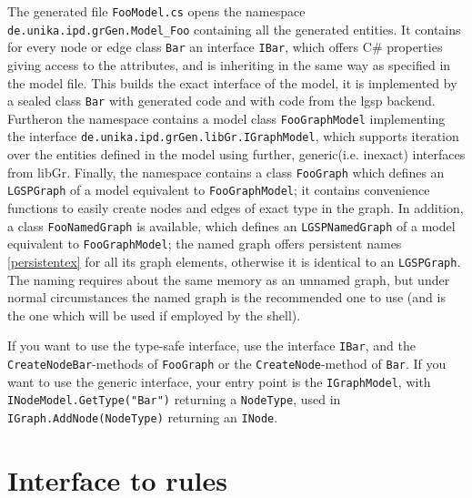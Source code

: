 The generated file \texttt{FooModel.cs} opens the namespace \texttt{de.unika.ipd.grGen.Model\_Foo} containing all the generated entities.
It contains for every node or edge class \texttt{Bar} an interface \texttt{IBar}, which offers C\# properties giving access to the attributes, and is inheriting in the same way as specified in the model file.
This builds the exact interface of the model, it is implemented by a sealed class \texttt{Bar} with generated code and with code from the lgsp backend.
Furtheron the namespace contains a model class \texttt{FooGraphModel} implementing the interface \texttt{de.unika.ipd.grGen.libGr.IGraphModel},
which supports iteration over the entities defined in the model using further, generic(i.e. inexact) interfaces from libGr.
Finally, the namespace contains a class \texttt{FooGraph} which defines an \texttt{LGSPGraph} of a model equivalent to \texttt{FooGraphModel}; 
it contains convenience functions to easily create nodes and edges of exact type in the graph.
In addition, a class \texttt{FooNamedGraph} is available, which defines an \texttt{LGSPNamedGraph} of a model equivalent to \texttt{FooGraphModel}; 
the named graph offers persistent names \ref{persistentex} for all its graph elements, otherwise it is identical to an \texttt{LGSPGraph}.
The naming requires about the same memory as an unnamed graph, but under normal circumstances the named graph is the recommended one to use (and is the one which will be used if employed by the shell).

\begin{note}
If you want to use the type-safe interface, use the interface \texttt{IBar}, and the \texttt{CreateNodeBar}-methods of \texttt{FooGraph} or the \texttt{CreateNode}-method of \texttt{Bar}.
If you want to use the generic interface, your entry point is the \texttt{IGraphModel}, with \texttt{INodeModel.GetType("Bar")} returning a \texttt{NodeType}, used in \texttt{IGraph.AddNode(NodeType)} returning an \texttt{INode}.
\end{note}


\section{Interface to rules}

